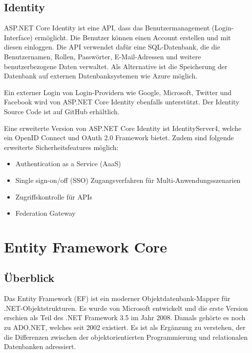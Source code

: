 \subsection{Identity}
\cite{ASPIdentityDoc}
\cite{ASPIdentityDocOld}

ASP.NET Core Identity ist eine API, dass das Benutzermanagement (Login-Interface) ermöglicht. 
Die Benutzer können einen Account erstellen und mit diesen einloggen. Die API verwendet dafür eine 
SQL-Datenbank, die die Benutzernamen, Rollen, Passwörter, E-Mail-Adressen und weitere benutzerbezogene Daten verwaltet. 
Als Alternative ist die Speicherung der Datenbank auf externen Datenbanksystemen wie Azure möglich.

Ein externer Login von Login-Providern wie Google, Microsoft, Twitter und Facebook wird von ASP.NET Core Identity ebenfalls unterstützt.
Der Identity Source Code ist auf GitHub erhältlich.

Eine erweiterte Version von ASP.NET Core Identity ist IdentityServer4, welche ein OpenID Connect und OAuth 2.0 Framework bietet.
Zudem sind folgende erweiterte Sicherheitsfeatures möglich:

\begin{itemize}
    \item Authentication as a Service (AaaS)
    \item Single sign-on/off (SSO) Zugangsverfahren für Multi-Anwendungsszenarien
    \item Zugriffskontrolle für APIs
    \item Federation Gateway
\end{itemize}

\newpage
\section{Entity Framework Core}
\subsection{Überblick}
\cite{CSharp8Rheinwerk}
\cite{EFCoreDocumentation}
\cite{EFCoreWikipedia}

Das Entity Framework (EF) ist ein moderner Objektdatenbank-Mapper für .NET-Objektstrukturen. Es
wurde von Microsoft entwickelt und die erste Version erschien als Teil des .NET Framework 3.5 im
Jahr 2008. Damals gehörte es noch zu ADO.NET, welches seit 2002 existiert.  Es ist als Ergänzung zu verstehen, 
der die Differenzen zwischen der objektorientierten Programmierung und relationalen Datenbanken adressiert.

